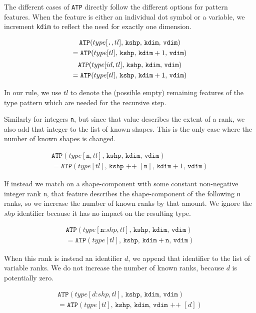 \documentclass[sigconf,screen]{acmart}
\newcommand{\tpdot}{\texttt{\textbf{.}}}
\newcommand{\tpnum}{\texttt{n}}
\newcommand{\tpnumshp}[2][\texttt{n}]{#1\texttt{:}#2}
\newcommand{\tpidshp}[2]{#1\texttt{:}#2}
\newcommand{\rest}{\ensuremath{tl}}
\newcommand{\atp}[4]{\ensuremath{\texttt{ATP}(#1,\,#2,\,#3,\,#4)}}
\newcommand{\fshp}{\texttt{kshp}}
\newcommand{\fdim}{\texttt{kdim}}
\newcommand{\vdim}{\texttt{vdim}}
\begin{document}
The different cases of \texttt{ATP} directly follow the different options for pattern features.
When the feature is either an individual dot symbol or a variable, we increment \fdim{} to reflect the need for exactly one dimension.

\begin{gather*}
  \atp{type[\tpdot,\rest]}{\fshp}{\fdim}{\vdim} \\
    = \atp{type[\rest]}{\fshp}{\fdim+1}{\vdim}
  \\[2pt]
  \atp{type[id,\rest]}{\fshp}{\fdim}{\vdim} \\
    = \atp{type[\rest]}{\fshp}{\fdim+1}{\vdim}
\end{gather*}

In our rule, we use $\rest$ to denote the (possible empty) remaining features of the type pattern which are needed for the recursive step.

Similarly for integers \tpnum{}, but since that value describes the extent of a rank, we also add that integer to the list of known shapes.
This is the only case where the number of known shapes is changed.

\begin{gather*}
  \atp{type[\tpnum,\rest]}{\fshp}{\fdim}{\vdim} \\
    = \atp{type[\rest]}{\fshp \text{ ++ } [\tpnum]}{\fdim+1}{\vdim}
\end{gather*}

If instead we match on a shape-component with some constant non-negative integer rank \texttt{n}, that feature describes the shape-component of the following \texttt{n} ranks, so we increase the number of known ranks by that amount.
We ignore the $shp$ identifier because it has no impact on the resulting type.

\begin{gather*}
  \atp{type[\tpnumshp{shp},\rest]}{\fshp}{\fdim}{\vdim} \\
    = \atp{type[\rest]}{\fshp}{\fdim+\tpnum}{\vdim}
\end{gather*}

When this rank is instead an identifier $d$, we append that identifier to the list of variable ranks.
We do not increase the number of known ranks, because $d$ is potentially zero.

\begin{gather*}
  \atp{type[\tpidshp{d}{shp},\rest]}{\fshp}{\fdim}{\vdim} \\
    = \atp{type[\rest]}{\fshp}{\fdim}{\vdim \text{ ++ } [d]}
\end{gather*}
\end{document}
